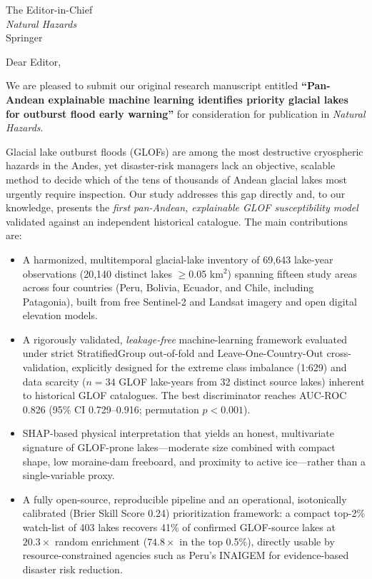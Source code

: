 \documentclass[11pt]{letter}
\begin{document}
\begin{letter}{The Editor-in-Chief\\ \textit{Natural Hazards}\\ Springer}

\opening{Dear Editor,}

We are pleased to submit our original research manuscript entitled
\textbf{``Pan-Andean explainable machine learning identifies priority
glacial lakes for outburst flood early warning''} for consideration for
publication in \textit{Natural Hazards}.

Glacial lake outburst floods (GLOFs) are among the most destructive
cryospheric hazards in the Andes, yet disaster-risk managers lack an
objective, scalable method to decide which of the tens of thousands of
Andean glacial lakes most urgently require inspection. Our study
addresses this gap directly and, to our knowledge, presents the
\emph{first pan-Andean, explainable GLOF susceptibility model} validated
against an independent historical catalogue. The main contributions are:

\begin{itemize}
\item A harmonized, multitemporal glacial-lake inventory of 69{,}643
  lake-year observations (20{,}140 distinct lakes $\geq$0.05 km$^2$)
  spanning fifteen study areas across four countries (Peru, Bolivia,
  Ecuador, and Chile, including Patagonia), built from free Sentinel-2
  and Landsat imagery and open digital elevation models.
\item A rigorously validated, \emph{leakage-free} machine-learning
  framework evaluated under strict StratifiedGroup out-of-fold and
  Leave-One-Country-Out cross-validation, explicitly designed for the
  extreme class imbalance (1:629) and data scarcity ($n=34$ GLOF
  lake-years from 32 distinct source lakes) inherent to historical GLOF
  catalogues. The best discriminator reaches AUC-ROC 0.826
  (95\% CI 0.729--0.916; permutation $p<0.001$).
\item SHAP-based physical interpretation that yields an honest,
  multivariate signature of GLOF-prone lakes---moderate size combined
  with compact shape, low moraine-dam freeboard, and proximity to active
  ice---rather than a single-variable proxy.
\item A fully open-source, reproducible pipeline and an operational,
  isotonically calibrated (Brier Skill Score 0.24) prioritization
  framework: a compact top-2\% watch-list of 403 lakes recovers 41\% of
  confirmed GLOF-source lakes at $20.3\times$ random enrichment
  ($74.8\times$ in the top 0.5\%), directly usable by resource-constrained
  agencies such as Peru's INAIGEM for evidence-based disaster risk
  reduction.
\end{itemize}


\end{letter}
\end{document}
